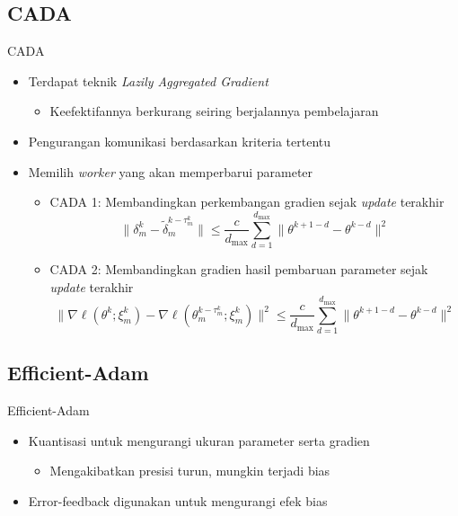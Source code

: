 \documentclass[aspectratio=169]{beamer}
\begin{document}
\subsection{CADA}
\begin{frame}{CADA}
  \begin{itemize}
    \item Terdapat teknik \textit{Lazily Aggregated Gradient} \parencite{Chen2018LAG}
          \begin{itemize}
            \item Keefektifannya berkurang seiring berjalannya pembelajaran
          \end{itemize}
    \item Pengurangan komunikasi berdasarkan kriteria tertentu
    \item Memilih \textit{worker} yang akan memperbarui parameter
          \begin{itemize}
            \item CADA 1: Membandingkan perkembangan gradien sejak \textit{update} terakhir
                  \begin{equation*}
                    \| \delta_m^k - \tilde{\delta}_m^{k-\tau_m^k} \| \le \frac{c}{d_{\mathrm{max}}}\sum_{d=1}^{d_{\mathrm{max}}}\| \theta^{k+1-d} - \theta^{k-d} \|^2
                  \end{equation*}
            \item CADA 2: Membandingkan gradien hasil pembaruan parameter sejak \textit{update} terakhir
                  \begin{equation*}
                    \| \nabla \ell (\theta^k; \xi_m^k) - \nabla \ell (\theta_m^{k-\tau_m^k}; \xi_m^k) \|^2 \le \frac{c}{d_{\mathrm{max}}} \sum_{d=1}^{d_{\mathrm{max}}} \| \theta^{k+1-d} - \theta^{k-d} \|^2
                  \end{equation*}
          \end{itemize}
  \end{itemize}
\end{frame}

\subsection{Efficient-Adam}
\begin{frame}{Efficient-Adam}
  \begin{itemize}
    \item Kuantisasi untuk mengurangi ukuran parameter serta gradien
          \begin{itemize}
            \item Mengakibatkan presisi turun, mungkin terjadi bias
          \end{itemize}
    \item Error-feedback digunakan untuk mengurangi efek bias
  \end{itemize}
\end{frame}
\end{document}
